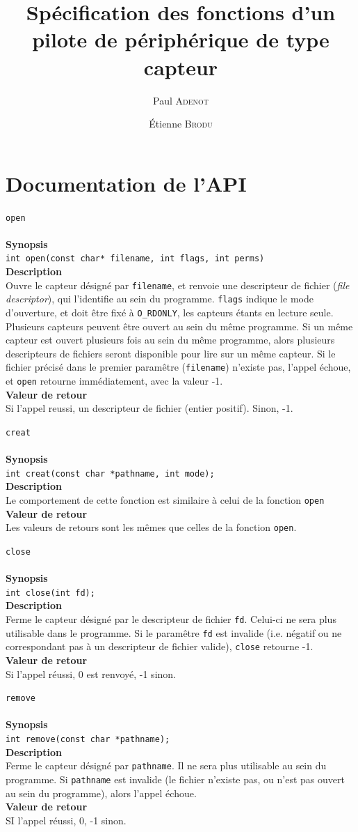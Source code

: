 \documentclass[11pt, a4paper]{article}
\title{Spécification des fonctions d'un pilote de périphérique de type capteur}
\author{Paul \textsc{Adenot} \and \'{E}tienne \textsc{Brodu}}
\date{}
\begin{document}
\maketitle

\newcommand{\kw}[1]{\texttt{#1}}

\newcommand{\DescFonction}[4]{%
	\texttt{\Huge{#1}} \\ 
	\raisebox{0.5em}{\rule{\textwidth}{0.1ex}}\\
	\textbf{\large{Synopsis}} \\
	\texttt{#2} \\
	\textbf{\large{Description}} \\
	#3 \\
	\textbf{\large{Valeur de retour}} \\
	#4 
	\vspace{1cm}
}

\section{Documentation de l'API}
\DescFonction{open}
{int open(const char* filename, int flags, int perms)}
{Ouvre le capteur désigné par \kw{filename}, et renvoie une descripteur de fichier (\emph{file descriptor}), qui l'identifie au sein du programme. \kw{flags} indique le mode d'ouverture, et doit être fixé à \kw{O\_RDONLY}, les capteurs étants en lecture seule. Plusieurs capteurs peuvent être ouvert au sein du même programme. Si un même capteur est ouvert plusieurs fois au sein du même programme, alors plusieurs descripteurs de fichiers seront disponible pour lire sur un même capteur. Si le fichier précisé dans le premier paramêtre (\kw{filename}) n'existe pas, l'appel échoue, et \kw{open} retourne immédiatement, avec la valeur -1.}
{Si l'appel reussi, un descripteur de fichier (entier positif). Sinon, -1.}

\DescFonction{creat}
{int creat(const char *pathname, int mode);}
{Le comportement de cette fonction est similaire à celui de la fonction \kw{open}}
{Les valeurs de retours sont les mêmes que celles de la fonction \kw{open}.}

\DescFonction{close}
{int close(int fd);}
{Ferme le capteur désigné par le descripteur de fichier \kw{fd}. Celui-ci ne sera plus utilisable dans le programme.
Si le paramêtre \kw{fd} est invalide (i.e. négatif ou ne correspondant pas à un descripteur de fichier valide), \kw{close} retourne -1.}
{Si l'appel réussi, 0 est renvoyé, -1 sinon.}

\DescFonction{remove}
{int remove(const char *pathname);}
{Ferme le capteur désigné par \kw{pathname}. Il ne sera plus utilisable au sein du programme.
Si \kw{pathname} est invalide (le fichier n'existe pas, ou n'est pas ouvert au sein du programme), alors l'appel échoue.}
{SI l'appel réussi, 0, -1 sinon.}
\end{document}
